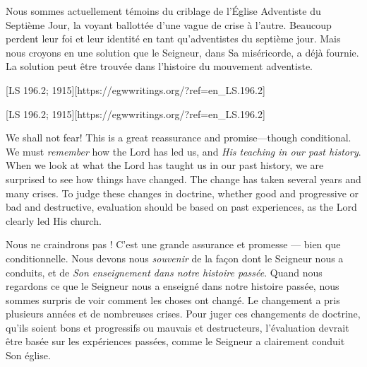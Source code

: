Nous sommes actuellement témoins du criblage de l'Église Adventiste du Septième Jour, la voyant ballottée d'une vague de crise à l'autre. Beaucoup perdent leur foi et leur identité en tant qu'adventistes du septième jour. Mais nous croyons en une solution que le Seigneur, dans Sa miséricorde, a déjà fournie. La solution peut être trouvée dans l'histoire du mouvement adventiste.


[LS 196.2; 1915][https://egwwritings.org/?ref=en\_LS.196.2]


[LS 196.2; 1915][https://egwwritings.org/?ref=en\_LS.196.2]


We shall not fear! This is a great reassurance and promise—though conditional. We must \textit{remember} how the Lord has led us, and \textit{His teaching in our past history}. When we look at what the Lord has taught us in our past history, we are surprised to see how things have changed. The change has taken several years and many crises. To judge these changes in doctrine, whether good and progressive or bad and destructive, evaluation should be based on past experiences, as the Lord clearly led His church.


Nous ne craindrons pas ! C'est une grande assurance et promesse — bien que conditionnelle. Nous devons nous \textit{souvenir} de la façon dont le Seigneur nous a conduits, et de \textit{Son enseignement dans notre histoire passée}. Quand nous regardons ce que le Seigneur nous a enseigné dans notre histoire passée, nous sommes surpris de voir comment les choses ont changé. Le changement a pris plusieurs années et de nombreuses crises. Pour juger ces changements de doctrine, qu'ils soient bons et progressifs ou mauvais et destructeurs, l'évaluation devrait être basée sur les expériences passées, comme le Seigneur a clairement conduit Son église.


